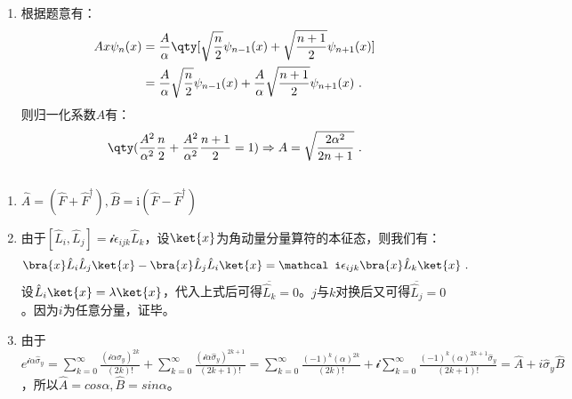 
\begin{issues}
\issueDraft
\end{issues}

\subsection{ }
\begin{enumerate}
\item 根据题意有：
\begin{equation}
\begin{aligned}
Ax\psi_n(x)&=\frac{A}{\alpha}\qty[\sqrt{\frac{n}{2}}\psi_{n-1}(x)+\sqrt{\frac{n+1}{2}}\psi_{n+1}(x)] \\
&=\frac{A}{\alpha}\sqrt{\frac{n}{2}}\psi_{n-1}(x)+\frac{A}{\alpha}\sqrt{\frac{n+1}{2}}\psi_{n+1}(x)~.
\end{aligned}
\end{equation}
则归一化系数$A$有：
\begin{equation}
\qty(\frac{A^2}{{\alpha}^2}\frac{n}{2}+\frac{A^2}{{\alpha}^2}\frac{n+1}{2}=1)\Rightarrow A=\sqrt{\frac{2\alpha^2}{2n+1}}~.
\end{equation}
\end{enumerate}
\subsection{ }
\begin{enumerate}
\item $\hat A=(\hat F+\hat F^\dagger),\hat B=\mathrm i(\hat F-\hat F^\dagger)$
\item 
由于$[\hat L_i,\hat L_j]=\mathcal i\epsilon_{ijk}\hat L_k$，设$\ket{x}$为角动量分量算符的本征态，则我们有：
\begin{equation}
\bra{x}\hat L_i\hat L_j\ket{x}-\bra{x}\hat L_j\hat L_i\ket{x}=\mathcal i\epsilon_{ijk}\bra{x}\hat L_k\ket{x}~.
\end{equation}
设$\hat L_i\ket{x}=\lambda\ket{x}$，代入上式后可得$\overline {\hat L_k}=0$。$j$与$k$对换后又可得$\overline {\hat L_j}=0$。因为$i$为任意分量，证毕。
\item 由于$e^{\mathcal i\alpha \hat {\sigma}_y}=\sum\limits^{\infty}_{k=0}\frac{(\mathcal i \alpha \hat {\sigma}_y)^{2k}}{(2k)!}+\sum\limits^{\infty}_{k=0}\frac{(\mathcal i \alpha \hat {\sigma}_y)^{2k+1}}{(2k+1)!}=\sum\limits^{\infty}_{k=0}\frac{(-1)^k (\alpha )^{2k}}{(2k)!}+\mathcal i\sum\limits^{\infty}_{k=0}\frac{(-1)^k( \alpha )^{2k+1}\hat {\sigma}_y}{(2k+1)!}=\hat A+i\hat {\sigma}_y \hat B$，所以$\hat A=cos\alpha,\hat B=sin\alpha$。
\end{enumerate}
\subsection{ }
\subsection{ }
\subsection{ }
